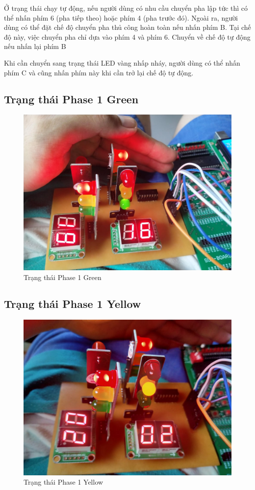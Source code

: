 \documentclass[a4paper]{article}
\begin{document}
Ở trạng thái chạy tự động, nếu người dùng có nhu cầu chuyển pha lập tức thì có thể nhấn phím 6 (pha tiếp theo) hoặc phím 4 (pha trước đó). Ngoài ra, người dùng có thể đặt chế độ chuyển pha thủ công hoàn toàn nếu nhấn phím B. Tại chế độ này, việc chuyển pha chỉ dựa vào phím 4 và phím 6. Chuyển về chế độ tự động nếu nhấn lại phím B

Khi cần chuyển sang trạng thái LED vàng nhấp nháy, người dùng có thể nhấn phím C và cũng nhấn phím này khi cần trở lại chế độ tự động.


\subsection{Trạng thái Phase 1 Green}
\begin{figure}[H]
\begin{center}
\includegraphics[width=12cm]{pic9.jpg}
\caption{Trạng thái Phase 1 Green}
\end{center}
\end{figure}
\subsection{Trạng thái Phase 1 Yellow}
\begin{figure}[H]
\begin{center}
\includegraphics[width=12cm]{pic10.jpg}
\caption{Trạng thái Phase 1 Yellow}
\end{center}
\end{figure}
\end{document}
